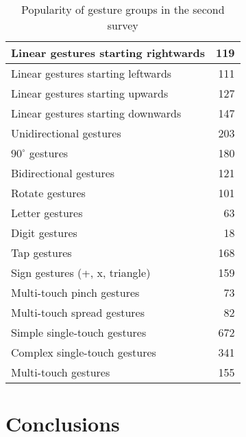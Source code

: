 \documentclass{aes130}
\begin{document}
\begin{table} \label{tab:Survey2Groups}
\begin{center}
\begin{tabular}{|l|r|} \hline

Linear gestures starting rightwards & 119 \\ \hline
Linear gestures starting leftwards  & 111 \\ \hline
Linear gestures starting upwards    & 127 \\ \hline
Linear gestures starting downwards  & 147 \\ \hline \hline

Unidirectional gestures             & 203 \\ \hline
$90^\circ$ gestures                 & 180 \\ \hline
Bidirectional gestures              & 121 \\ \hline \hline

Rotate gestures                     & 101 \\ \hline \hline

Letter gestures                     &  63 \\ \hline
Digit gestures                      &  18 \\ \hline
Tap gestures                        & 168 \\ \hline
Sign gestures (+, x, triangle)      & 159 \\ \hline \hline

Multi-touch pinch gestures          &  73 \\ \hline
Multi-touch spread gestures         &  82 \\ \hline \hline

Simple single-touch gestures        & 672 \\ \hline
Complex single-touch gestures       & 341 \\ \hline
Multi-touch gestures                & 155 \\ \hline

\end{tabular}
\end{center}
\caption{Popularity of gesture groups in the second survey}
\end{table}




\section{Conclusions} \label{sec:Conclusions}
\end{document}
